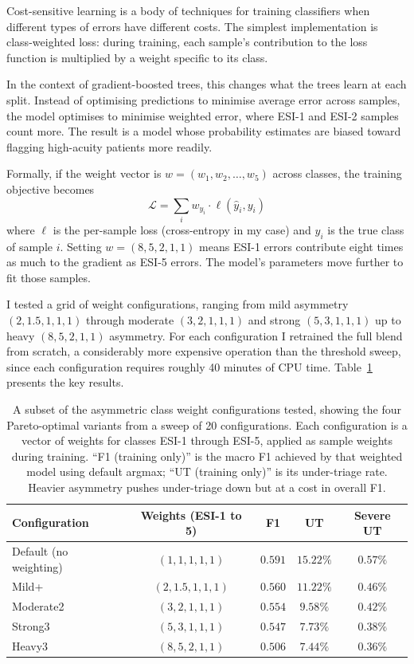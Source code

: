 \begin{notebox}
Cost-sensitive learning is a body of techniques for training classifiers when different types of errors have different costs. The simplest implementation is class-weighted loss: during training, each sample's contribution to the loss function is multiplied by a weight specific to its class.

In the context of gradient-boosted trees, this changes what the trees learn at each split. Instead of optimising predictions to minimise average error across samples, the model optimises to minimise weighted error, where ESI-1 and ESI-2 samples count more. The result is a model whose probability estimates are biased toward flagging high-acuity patients more readily.

Formally, if the weight vector is $w = (w_1, w_2, \ldots, w_5)$ across classes, the training objective becomes
\[
\mathcal{L} = \sum_{i} w_{y_i} \cdot \ell(\hat{y}_i, y_i)
\]
where $\ell$ is the per-sample loss (cross-entropy in my case) and $y_i$ is the true class of sample $i$. Setting $w = (8, 5, 2, 1, 1)$ means ESI-1 errors contribute eight times as much to the gradient as ESI-5 errors. The model's parameters move further to fit those samples.
\end{notebox}

I tested a grid of weight configurations, ranging from mild asymmetry $(2, 1.5, 1, 1, 1)$ through moderate $(3, 2, 1, 1, 1)$ and strong $(5, 3, 1, 1, 1)$ up to heavy $(8, 5, 2, 1, 1)$ asymmetry. For each configuration I retrained the full blend from scratch, a considerably more expensive operation than the threshold sweep, since each configuration requires roughly 40 minutes of CPU time. Table~\ref{tab:asym-weights} presents the key results.

\begin{table}[htbp]
 \centering
 \caption[Asymmetric training weight configurations]{A subset of the asymmetric class weight configurations tested, showing the four Pareto-optimal variants from a sweep of 20 configurations. Each configuration is a vector of weights for classes ESI-1 through ESI-5, applied as sample weights during training. ``F1 (training only)'' is the macro F1 achieved by that weighted model using default argmax; ``UT (training only)'' is its under-triage rate. Heavier asymmetry pushes under-triage down but at a cost in overall F1.}
 \label{tab:asym-weights}
 \small
 \begin{tabular}{lcccc}
 \toprule
 Configuration & Weights (ESI-1 to 5) & F1 & UT & Severe UT \\
 \midrule
 Default (no weighting) & $(1, 1, 1, 1, 1)$ & $0.591$ & $15.22\%$ & $0.57\%$ \\
 Mild+ & $(2, 1.5, 1, 1, 1)$ & $0.560$ & $11.22\%$ & $0.46\%$ \\
 Moderate2 & $(3, 2, 1, 1, 1)$ & $0.554$ & $9.58\%$ & $0.42\%$ \\
 Strong3 & $(5, 3, 1, 1, 1)$ & $0.547$ & $7.73\%$ & $0.38\%$ \\
 Heavy3 & $(8, 5, 2, 1, 1)$ & $0.506$ & $7.44\%$ & $0.36\%$ \\
 \bottomrule
 \end{tabular}
\end{table}

